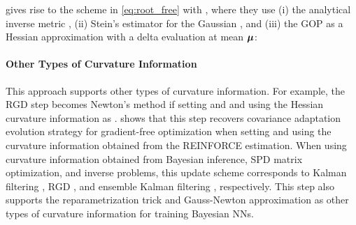 \vspace{-0.1cm}
gives rise to the scheme in \eqref {eq:root_free} with \scalebox{0.8}{$p=1$}, where they use (i) the analytical inverse  metric
, (ii) 
Stein's estimator for the Gaussian \citep{opper2009variational}, and (iii) the GOP as a Hessian approximation \citep{lincan2024} \scalebox{0.8}{$\nabla_\mu^2 \ell \approx   \vg\vg^T$}  
with a delta evaluation at mean $\mbox{$\mbox{$\boldsymbol{\mu}$}$}$:

\vspace{-0.5cm}

\vspace{-0.35cm}
\paragraph{
Other Types of Curvature Information
}
This approach supports other types of curvature information.
For example, the RGD step becomes Newton's method \citep{khan18a}  if setting \scalebox{0.8}{$\stepsize=1$} and \scalebox{0.8}{$\gamma=1$} and using the Hessian curvature  information as  .
%
\citet{lin2021tractable} shows that this step recovers covariance adaptation evolution strategy \citep{wierstra2008natural} for gradient-free optimization when setting \scalebox{0.8}{$\gamma=0$} and using the curvature information obtained  from the REINFORCE  \citep{williams1992simple} estimation.
%
When using curvature information obtained from 
Bayesian inference,
 SPD matrix optimization, and inverse problems, this update scheme corresponds to Kalman filtering  \citep{khan2023bayesian},
RGD \citep{lin2023simplifying},
and ensemble Kalman filtering \citep{chen2024efficient}, respectively.
This step also supports the reparametrization trick \citep{lin2020handling} and Gauss-Newton approximation \citep{osawa2019practical} 
as other types of curvature information for training Bayesian NNs.
%

